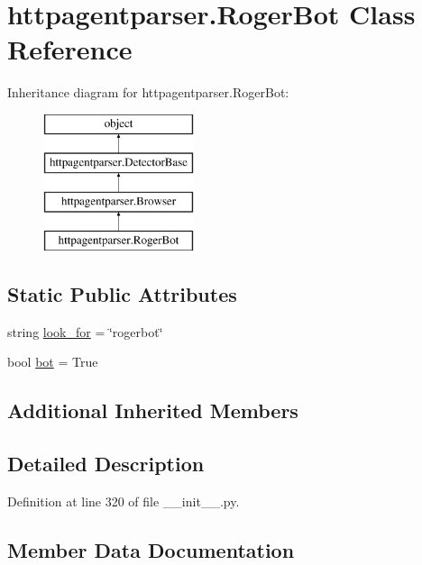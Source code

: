 \hypertarget{classhttpagentparser_1_1_roger_bot}{}\section{httpagentparser.\+Roger\+Bot Class Reference}
\label{classhttpagentparser_1_1_roger_bot}
Inheritance diagram for httpagentparser.\+Roger\+Bot\+:\begin{figure}[H]
\begin{center}
\leavevmode
\includegraphics[height=4.000000cm]{classhttpagentparser_1_1_roger_bot}
\end{center}
\end{figure}
\subsection*{Static Public Attributes}
\begin{DoxyCompactItemize}
\item 
string \hyperlink{classhttpagentparser_1_1_roger_bot_a393ead1441fb4e0ef40ab242db0073e6}{look\+\_\+for} = \char`\"{}rogerbot\char`\"{}
\item 
bool \hyperlink{classhttpagentparser_1_1_roger_bot_aded75a87fc98b123f5d0a0aba3f82e02}{bot} = True
\end{DoxyCompactItemize}
\subsection*{Additional Inherited Members}


\subsection{Detailed Description}


Definition at line 320 of file \+\_\+\+\_\+init\+\_\+\+\_\+.\+py.



\subsection{Member Data Documentation}
\hypertarget{classhttpagentparser_1_1_roger_bot_aded75a87fc98b123f5d0a0aba3f82e02}{}\label{classhttpagentparser_1_1_roger_bot_aded75a87fc98b123f5d0a0aba3f82e02} 
